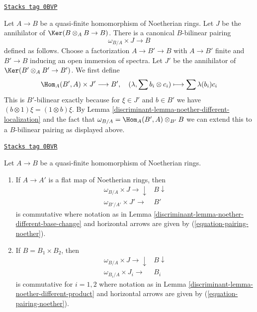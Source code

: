 \begin{remark}
\label{discriminant-remark-construction-pairing}
\href{https://stacks.math.columbia.edu/tag/0BVP}{\texttt{Stacks tag 0BVP}}

Let $A \to B$ be a quasi-finite homomorphism of Noetherian rings.
Let $J$ be the annihilator of $\Ker(B \otimes_A B \to B)$.
There is a canonical $B$-bilinear pairing
\begin{equation}
\label{equation-pairing-noether}
\omega_{B/A} \times J \longrightarrow B
\end{equation}
defined as follows. Choose a factorization $A \to B' \to B$
with $A \to B'$ finite and $B' \to B$ inducing an open immersion
of spectra. Let $J'$ be the annihilator of $\Ker(B' \otimes_A B' \to B')$.
We first define
$$
\Hom_A(B', A) \times J' \longrightarrow B',\quad
(\lambda, \sum b_i \otimes c_i) \longmapsto \sum \lambda(b_i)c_i
$$
This is $B'$-bilinear exactly because for $\xi \in J'$ and $b \in B'$
we have $(b \otimes 1)\xi = (1 \otimes b)\xi$. By
Lemma \ref{discriminant-lemma-noether-different-localization}
and the fact that $\omega_{B/A} = \Hom_A(B', A) \otimes_{B'} B$
we can extend this to a $B$-bilinear pairing as displayed above.
\end{remark}

\begin{lemma}
\label{discriminant-lemma-noether-pairing-compatibilities}
\href{https://stacks.math.columbia.edu/tag/0BVR}{\texttt{Stacks tag 0BVR}}

Let $A \to B$ be a quasi-finite homomorphism of Noetherian rings.
\begin{enumerate}
\item If $A \to A'$ is a flat map of Noetherian rings, then
$$
\begin{array}{cc}\omega_{B/A} \times J \longrightarrow\downarrow & B \downarrow \\ \omega_{B'/A'} \times J' \longrightarrow & B'\end{array}
$$
is commutative where notation as in
Lemma \ref{discriminant-lemma-noether-different-base-change}
and horizontal arrows are given by
(\ref{equation-pairing-noether}).
\item If $B = B_1 \times B_2$, then
$$
\begin{array}{cc}\omega_{B/A} \times J \longrightarrow\downarrow & B \downarrow \\ \omega_{B_i/A} \times J_i \longrightarrow & B_i\end{array}
$$
is commutative for $i = 1, 2$ where notation as in
Lemma \ref{discriminant-lemma-noether-different-product}
and horizontal arrows are given by
(\ref{equation-pairing-noether}).
\end{enumerate}
\end{lemma}

